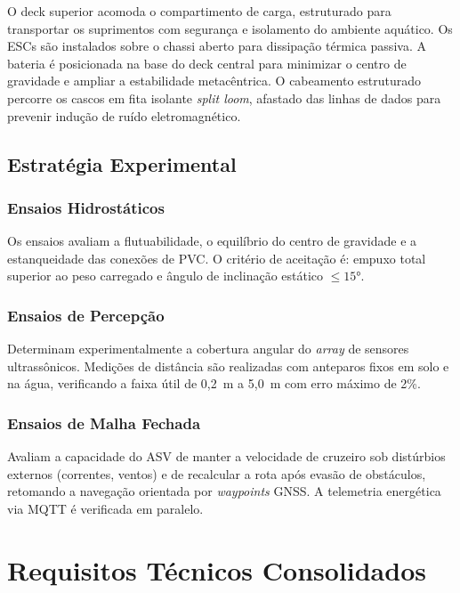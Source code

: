 \documentclass[12pt,a4paper]{article}
\begin{document}
O deck superior acomoda o compartimento de carga, estruturado para transportar os suprimentos com segurança e isolamento do ambiente aquático. Os ESCs são instalados sobre o chassi aberto para dissipação térmica passiva. A bateria é posicionada na base do deck central para minimizar o centro de gravidade e ampliar a estabilidade metacêntrica. O cabeamento estruturado percorre os cascos em fita isolante \textit{split loom}, afastado das linhas de dados para prevenir indução de ruído eletromagnético.


\subsection{Estratégia Experimental}

\subsubsection{Ensaios Hidrostáticos}

Os ensaios avaliam a flutuabilidade, o equilíbrio do centro de gravidade e a estanqueidade das conexões de PVC. O critério de aceitação é: empuxo total superior ao peso carregado e ângulo de inclinação estático $\le 15°$.

\subsubsection{Ensaios de Percepção}

Determinam experimentalmente a cobertura angular do \textit{array} de sensores ultrassônicos. Medições de distância são realizadas com anteparos fixos em solo e na água, verificando a faixa útil de 0{,}2~m a 5{,}0~m com erro máximo de 2\%.

\subsubsection{Ensaios de Malha Fechada}

Avaliam a capacidade do ASV de manter a velocidade de cruzeiro sob distúrbios externos (correntes, ventos) e de recalcular a rota após evasão de obstáculos, retomando a navegação orientada por \textit{waypoints} GNSS. A telemetria energética via MQTT é verificada em paralelo.

\section{Requisitos Técnicos Consolidados}
\end{document}
